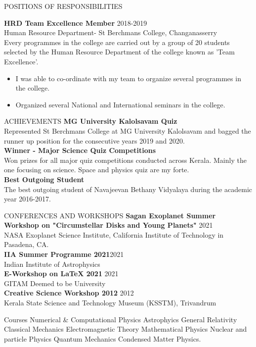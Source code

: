 \documentclass{resume} %
\begin{document}
\begin{rSection}{POSITIONS OF RESPONSIBILITIES}
	
	\textbf{HRD Team Excellence Member } \hfill 2018-2019\\
	Human Resource Department- St Berchmans College, Changanasserry \\
	Every programmes in the college are carried out by a group of 20 students selected by the Human Resource Department of the college known as 'Team Excellence'. 
	\begin{itemize}[noitemsep,topsep=-0.2cm]
		\itemsep-0.05cm
		\item I was able to co-ordinate with my team to organize several programmes in the college. 
		\item Organized several National and International seminars in the college. 
	\end{itemize}
\end{rSection}

\begin{rSection}{ACHIEVEMENTS }
\textbf{MG University Kalolsavam Quiz}\\
Represented St Berchmans College at MG University Kalolsavam and bagged the runner up position for the consecutive years 2019 and 2020. \\
\textbf{Winner - Major Science  Quiz Competitions }\\
Won prizes for all major quiz competitions conducted across Kerala. Mainly the one focusing on science. Space and physics quiz are my forte.\\
\textbf{Best Outgoing Student}\\
The best outgoing student of Navajeevan Bethany Vidyalaya during the academic year 2016-2017.\\
\end{rSection} 


\begin{rSection}{CONFERENCES AND WORKSHOPS }
	\textbf{Sagan Exoplanet Summer Workshop on "Circumstellar Disks and Young Planets"} \hfill 2021\\
	NASA Exoplanet Science Institute, California Institute of Technology in Pasadena, CA.  \\
	\textbf{IIA Summer Programme 2021}\hfill 2021\\
	Indian Institute of Astrophysics  \\
	\textbf{E-Workshop on LaTeX 2021 }\hfill 2021\\
	GITAM Deemed to be University \\
	\textbf{Creative Science Workshop 2012 } \hfill 2012\\
	Kerala State Science and Technology Museum (KSSTM), Trivandrum \\
\end{rSection}


\begin{rSection}{Courses}
	Numerical \& Computational Physics \textbar{} Astrophyics \textbar{} General Relativity \textbar{} Classical Mechanics \textbar{} Electromagnetic Theory \textbar{} Mathematical Physics \textbar{} Nuclear and particle Physics \textbar{}
	Quantum Mechanics \textbar{} Condensed Matter Physics.
\end{rSection}
\end{document}
